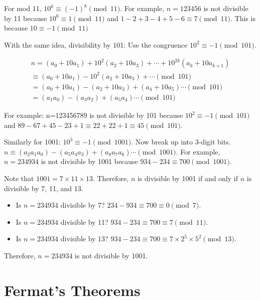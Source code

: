 \documentclass[letterpaper,12pt,oneside]{article}
\begin{document}
For mod 11, $10^k\equiv (-1)^k \pmod {11}$. For example, $n=123456$ is not divisible by 11 because $10^6\equiv 1 \pmod {11}$ and $1-2+3-4+5-6\equiv 7 \pmod {11}$. This is because $10\equiv -1 \pmod 11$

With the same idea, divisibility by 101: Use the congruence $10^2 \equiv -1 \pmod {101}$.

\begin{align*}
    n = (a_0+10a_1)+10^2(a_2+10a_3)+\cdots+10^{2k}(a_k+10a_{k+1})\\\equiv (a_0+10a_1)-10^2(a_2+10a_3)+\cdots \pmod {101}\\
    = (a_0+10a_1)-(a_2+10a_3)+ (a_4 +10 a_5)\cdots \pmod {101}\\
    = (a_1 a_0)-(a_3 a_2)+ (a_5 a_4)\cdots \pmod {101}
\end{align*}

For example: n=123456789 is not divisible by 101 because $10^2\equiv -1 \pmod {101}$ and $89 - 67 + 45 - 23 + 1\equiv 22+22+1 \equiv 45 \pmod {101}$.

Similarly for 1001: $10^3\equiv -1 \pmod {1001}$. Now break up into 3-digit bits. $n\equiv (a_2 a_1 a_0)-(a_5 a_4 a_3)+(a_8 a_7 a_6)\cdots \pmod {1001}$. For example, $n=234934$ is not divisible by 1001 because $934-234\equiv 700 \pmod {1001}$.

Note that $1001 = 7 \times 11 \times 13$. Therefore, $n$ is divisible by 1001 if and only if $n$ is divisible by 7, 11, and 13.

\begin{itemize}
    \item Is $n=234934$ divisible by 7? $234-934\equiv 700\equiv 0 \pmod 7$.
    \item Is $n=234934$ divisible by 11? $934-234\equiv 700\equiv 7 \pmod {11}$.
    \item Is $n=234934$ divisible by 13? $934-234\equiv 700\equiv 7\times 2^5 \times 5^2 \pmod {13}$.
\end{itemize}
   Therefore, $n=234934$ is not divisible by 1001.

\section{Fermat's Theorems}
\end{document}
